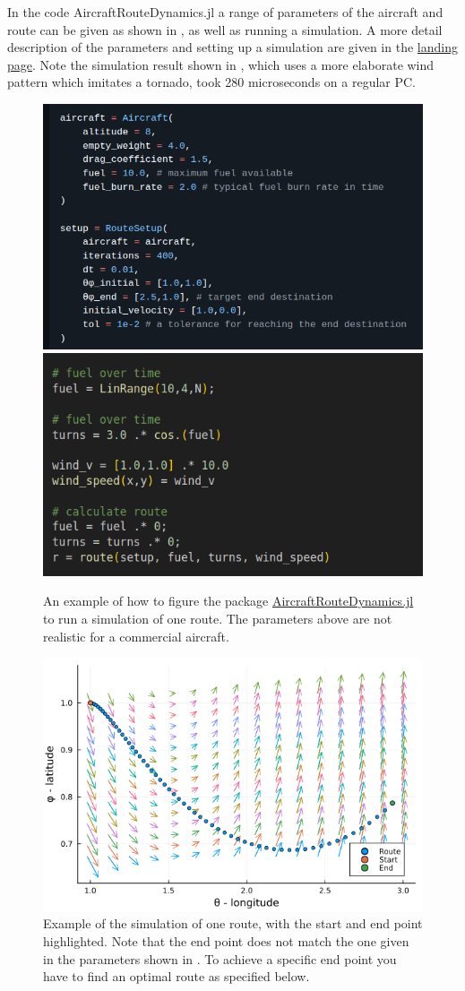 \documentclass{article}
\begin{document}
In the code AircraftRouteDynamics.jl a range of parameters of the aircraft and route can be given as shown in , as well as running a simulation. A more detail description of the parameters and setting up a simulation are given in the \href{https://github.com/arturgower/AircraftRouteDynamics.jl/blob/v0.0.1/README.md}{landing page}. Note the simulation result shown in , which uses a more elaborate wind pattern which imitates a tornado, took 280 microseconds on a regular PC.

\begin{figure}[h]
    \centering
    \includegraphics[width = 0.47\linewidth]{../imgs/configure-aircraft.png}
    \includegraphics[width = 0.37\linewidth]{../imgs/run-aircraft.png}
    \caption{An example of how to figure the package \href{https://github.com/arturgower/AircraftRouteDynamics.jl/tree/main}{AircraftRouteDynamics.jl} to run a simulation of one route. The parameters above are not realistic for a commercial aircraft.}
    \label{fig:configure-aircraft}
\end{figure}

\begin{figure}[h]
    \centering
    \includegraphics[width = 0.6\linewidth]{readme-1.png}
    \caption{Example of the simulation of one route, with the start and end point highlighted. Note that the end point does not match the one given in the parameters shown in . To achieve a specific end point you have to find an optimal route as specified below.}
    \label{fig:one-route}
\end{figure}
\end{document}
